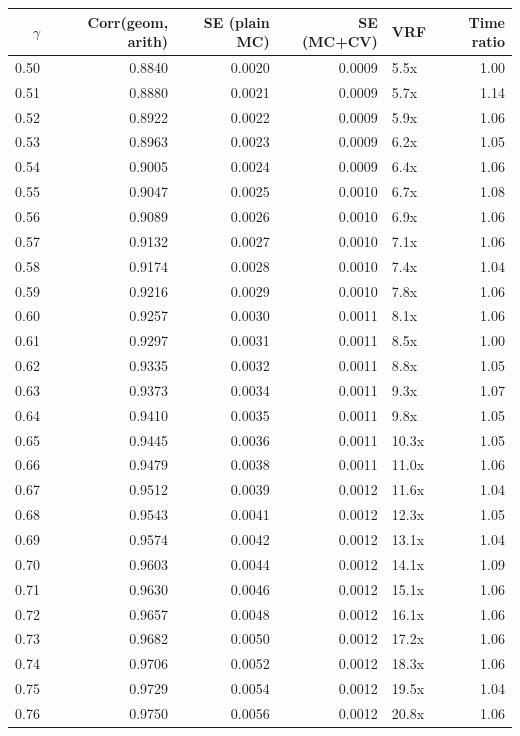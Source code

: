 \begin{tabular}{rrrrlr}
\toprule
$\gamma$ & Corr(geom, arith) & SE (plain MC) & SE (MC+CV) & VRF & Time ratio \\
\midrule
0.50 & 0.8840 & 0.0020 & 0.0009 & 5.5x & 1.00 \\
0.51 & 0.8880 & 0.0021 & 0.0009 & 5.7x & 1.14 \\
0.52 & 0.8922 & 0.0022 & 0.0009 & 5.9x & 1.06 \\
0.53 & 0.8963 & 0.0023 & 0.0009 & 6.2x & 1.05 \\
0.54 & 0.9005 & 0.0024 & 0.0009 & 6.4x & 1.06 \\
0.55 & 0.9047 & 0.0025 & 0.0010 & 6.7x & 1.08 \\
0.56 & 0.9089 & 0.0026 & 0.0010 & 6.9x & 1.06 \\
0.57 & 0.9132 & 0.0027 & 0.0010 & 7.1x & 1.06 \\
0.58 & 0.9174 & 0.0028 & 0.0010 & 7.4x & 1.04 \\
0.59 & 0.9216 & 0.0029 & 0.0010 & 7.8x & 1.06 \\
0.60 & 0.9257 & 0.0030 & 0.0011 & 8.1x & 1.06 \\
0.61 & 0.9297 & 0.0031 & 0.0011 & 8.5x & 1.00 \\
0.62 & 0.9335 & 0.0032 & 0.0011 & 8.8x & 1.05 \\
0.63 & 0.9373 & 0.0034 & 0.0011 & 9.3x & 1.07 \\
0.64 & 0.9410 & 0.0035 & 0.0011 & 9.8x & 1.05 \\
0.65 & 0.9445 & 0.0036 & 0.0011 & 10.3x & 1.05 \\
0.66 & 0.9479 & 0.0038 & 0.0011 & 11.0x & 1.06 \\
0.67 & 0.9512 & 0.0039 & 0.0012 & 11.6x & 1.04 \\
0.68 & 0.9543 & 0.0041 & 0.0012 & 12.3x & 1.05 \\
0.69 & 0.9574 & 0.0042 & 0.0012 & 13.1x & 1.04 \\
0.70 & 0.9603 & 0.0044 & 0.0012 & 14.1x & 1.09 \\
0.71 & 0.9630 & 0.0046 & 0.0012 & 15.1x & 1.06 \\
0.72 & 0.9657 & 0.0048 & 0.0012 & 16.1x & 1.06 \\
0.73 & 0.9682 & 0.0050 & 0.0012 & 17.2x & 1.06 \\
0.74 & 0.9706 & 0.0052 & 0.0012 & 18.3x & 1.06 \\
0.75 & 0.9729 & 0.0054 & 0.0012 & 19.5x & 1.04 \\
0.76 & 0.9750 & 0.0056 & 0.0012 & 20.8x & 1.06 \\

\end{tabular}
